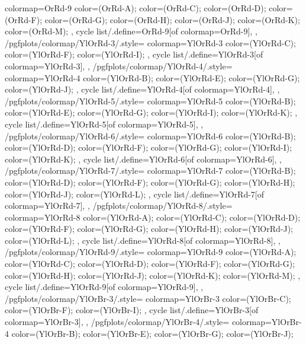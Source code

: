 {{    colormap={OrRd-9}{
      color=(OrRd-A);
      color=(OrRd-C);
      color=(OrRd-D);
      color=(OrRd-F);
      color=(OrRd-G);
      color=(OrRd-H);
      color=(OrRd-J);
      color=(OrRd-K);
      color=(OrRd-M);
    },
    cycle list/.define={OrRd-9}{[of colormap=OrRd-9]},
  },
  /pgfplots/colormap/YlOrRd-3/.style={
    colormap={YlOrRd-3}{
      color=(YlOrRd-C);
      color=(YlOrRd-F);
      color=(YlOrRd-I);
    },
    cycle list/.define={YlOrRd-3}{[of colormap=YlOrRd-3]},
  },
  /pgfplots/colormap/YlOrRd-4/.style={
    colormap={YlOrRd-4}{
      color=(YlOrRd-B);
      color=(YlOrRd-E);
      color=(YlOrRd-G);
      color=(YlOrRd-J);
    },
    cycle list/.define={YlOrRd-4}{[of colormap=YlOrRd-4]},
  },
  /pgfplots/colormap/YlOrRd-5/.style={
    colormap={YlOrRd-5}{
      color=(YlOrRd-B);
      color=(YlOrRd-E);
      color=(YlOrRd-G);
      color=(YlOrRd-I);
      color=(YlOrRd-K);
    },
    cycle list/.define={YlOrRd-5}{[of colormap=YlOrRd-5]},
  },
  /pgfplots/colormap/YlOrRd-6/.style={
    colormap={YlOrRd-6}{
      color=(YlOrRd-B);
      color=(YlOrRd-D);
      color=(YlOrRd-F);
      color=(YlOrRd-G);
      color=(YlOrRd-I);
      color=(YlOrRd-K);
    },
    cycle list/.define={YlOrRd-6}{[of colormap=YlOrRd-6]},
  },
  /pgfplots/colormap/YlOrRd-7/.style={
    colormap={YlOrRd-7}{
      color=(YlOrRd-B);
      color=(YlOrRd-D);
      color=(YlOrRd-F);
      color=(YlOrRd-G);
      color=(YlOrRd-H);
      color=(YlOrRd-J);
      color=(YlOrRd-L);
    },
    cycle list/.define={YlOrRd-7}{[of colormap=YlOrRd-7]},
  },
  /pgfplots/colormap/YlOrRd-8/.style={
    colormap={YlOrRd-8}{
      color=(YlOrRd-A);
      color=(YlOrRd-C);
      color=(YlOrRd-D);
      color=(YlOrRd-F);
      color=(YlOrRd-G);
      color=(YlOrRd-H);
      color=(YlOrRd-J);
      color=(YlOrRd-L);
    },
    cycle list/.define={YlOrRd-8}{[of colormap=YlOrRd-8]},
  },
  /pgfplots/colormap/YlOrRd-9/.style={
    colormap={YlOrRd-9}{
      color=(YlOrRd-A);
      color=(YlOrRd-C);
      color=(YlOrRd-D);
      color=(YlOrRd-F);
      color=(YlOrRd-G);
      color=(YlOrRd-H);
      color=(YlOrRd-J);
      color=(YlOrRd-K);
      color=(YlOrRd-M);
    },
    cycle list/.define={YlOrRd-9}{[of colormap=YlOrRd-9]},
  },
  /pgfplots/colormap/YlOrBr-3/.style={
    colormap={YlOrBr-3}{
      color=(YlOrBr-C);
      color=(YlOrBr-F);
      color=(YlOrBr-I);
    },
    cycle list/.define={YlOrBr-3}{[of colormap=YlOrBr-3]},
  },
  /pgfplots/colormap/YlOrBr-4/.style={
    colormap={YlOrBr-4}{
      color=(YlOrBr-B);
      color=(YlOrBr-E);
      color=(YlOrBr-G);
      color=(YlOrBr-J);
}}}
